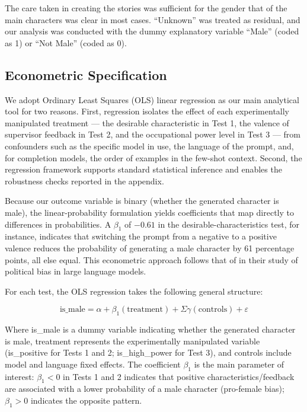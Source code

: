 \documentclass[12pt,a4paper]{article}
\begin{document}
The care taken in creating the stories was sufficient for the gender
that of the main characters was clear in most cases. ``Unknown''
was treated as residual, and our analysis was conducted with the dummy
explanatory variable ``Male'' (coded as 1) or ``Not Male''
(coded as 0).


\subsection{Econometric Specification}\label{sec:econometric-specification}


We adopt Ordinary Least Squares (OLS) linear regression as our main analytical
tool for two reasons. First, regression isolates the effect of each
experimentally manipulated treatment --- the desirable characteristic in Test
1, the valence of supervisor feedback in Test 2, and the occupational power
level in Test 3 --- from confounders such as the specific model in use, the
language of the prompt, and, for completion models, the order of examples in
the few-shot context. Second, the regression framework supports standard
statistical inference and enables the robustness checks reported in the
appendix.

Because our outcome variable is binary (whether the generated character is
male), the linear-probability formulation yields coefficients that map directly
to differences in probabilities. A $\beta_1$ of $-0.61$ in the
desirable-characteristics test, for instance, indicates that switching the
prompt from a negative to a positive valence reduces the probability of
generating a male character by 61 percentage points, all else equal. This
econometric approach follows that of \citet{motoki2024} in their study of
political bias in large language models.

For each test, the OLS regression takes the following general structure:

\begin{equation}
\text{is\_male} = \alpha + \beta_1(\text{treatment}) + \Sigma\gamma(\text{controls}) + \varepsilon
\end{equation}

Where is\_male is a dummy variable indicating whether the generated character is
male, treatment represents the experimentally manipulated variable
(is\_positive for Tests 1 and 2; is\_high\_power for Test 3), and
controls include model and language fixed effects. The coefficient $\beta_1$ is the
main parameter of interest: $\beta_1 < 0$ in Tests 1 and 2 indicates that
positive characteristics/feedback are associated with a lower
probability of a male character (pro-female bias); $\beta_1 > 0$
indicates the opposite pattern.
\end{document}
